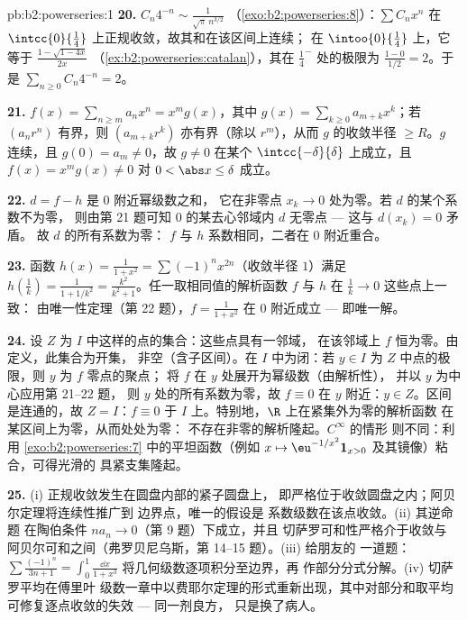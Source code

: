 \begin{solution}{pb:b2:powerseries:1}
\textbf{20.} $C_n4^{-n} \sim \frac{1}{\sqrt\pi\,n^{3/2}}$
（\cref{exo:b2:powerseries:8}）：$\sum
C_nx^n$ 在 $\intcc{0}{\frac14}$ 上正规收敛，故其和在该区间上连续；
在 $\intoo{0}{\frac14}$ 上，它等于
$\frac{1-\sqrt{1-4x}}{2x}$
（\cref{ex:b2:powerseries:catalan}），其在 $\frac14^-$ 处的极限为
$\frac{1-0}{1/2} = 2$。于是 $\sum_{n\geq0}
C_n4^{-n} = 2$。

\textbf{21.} $f(x) = \sum_{n\geq m}a_nx^n = x^m g(x)$，其中
$g(x) = \sum_{k\geq0}a_{m+k}x^k$；若 $(a_nr^n)$ 有界，则
$(a_{m+k}r^k)$ 亦有界（除以 $r^m$），从而 $g$ 的收敛半径 $\geq
R$。$g$ 连续，且 $g(0) = a_m \neq 0$，故 $g \neq 0$
在某个 $\intcc{-\delta}{\delta}$ 上成立，且 $f(x) = x^mg(x) \neq 0$
对 $0 < \abs x \leq \delta$ 成立。

\textbf{22.} $d = f - h$ 是 $0$ 附近幂级数之和，
它在非零点 $x_k \to 0$ 处为零。若 $d$ 的某个系数不为零，
则由第 21 题可知 $0$ 的某去心邻域内 $d$ 无零点 ---
这与 $d(x_k) = 0$ 矛盾。
故 $d$ 的所有系数为零：
$f$ 与 $h$ 系数相同，二者在 $0$ 附近重合。

\textbf{23.} 函数 $h(x) = \frac{1}{1+x^2} =
\sum(-1)^nx^{2n}$（收敛半径 $1$）满足 $h(\frac1k) =
\frac{1}{1 + 1/k^2} = \frac{k^2}{k^2+1}$。任一取相同值的解析函数 $f$
与 $h$ 在 $\frac1k \to 0$ 这些点上一致：
由唯一性定理（第 22 题），$f = \frac{1}{1+x^2}$
在 $0$ 附近成立 --- 即唯一解。

\textbf{24.} 设 $Z$ 为 $I$ 中这样的点的集合：这些点具有一邻域，
在该邻域上 $f$ 恒为零。由定义，此集合为开集，
非空（含子区间）。在 $I$ 中为闭：若 $y
\in I$ 为 $Z$ 中点的极限，则 $y$ 为 $f$ 零点的聚点；
将 $f$ 在 $y$ 处展开为幂级数（由解析性），
并以 $y$ 为中心应用第 21--22 题，
则 $y$ 处的所有系数为零，故 $f \equiv 0$ 在 $y$ 附近：$y
\in Z$。区间是连通的，故 $Z = I$：$f \equiv 0$ 于
$I$ 上。特别地，$\R$ 上在紧集外为零的解析函数
在某区间上为零，从而处处为零：
不存在非零的解析隆起。$C^\infty$ 的情形
则不同：利用
\cref{exo:b2:powerseries:7} 中的平坦函数（例如 $x \mapsto
\eu^{-1/x^2}\mathbf 1_{x>0}$ 及其镜像）粘合，可得光滑的
具紧支集隆起。

\textbf{25.} (i) 正规收敛发生在圆盘内部的紧子圆盘上，
即严格位于收敛圆盘之内；阿贝尔定理将连续性推广到
边界点，唯一的假设是
系数级数在该点收敛。(ii) 其逆命题
在陶伯条件 $na_n \to 0$（第 9 题）下成立，并且
切萨罗可和性严格介于收敛与
阿贝尔可和之间（弗罗贝尼乌斯，第 14--15 题）。(iii) 给朋友的
一道题：$\sum\frac{(-1)^n}{3n+1} = \int_0^1\frac{\dd x}{1+x^3}$
将几何级数逐项积分至边界，再
作部分分式分解。(iv) 切萨罗平均在傅里叶
级数一章中以费耶尔定理的形式重新出现，其中对部分和取平均
可修复逐点收敛的失效 --- 同一剂良方，
只是换了病人。
\end{solution}
